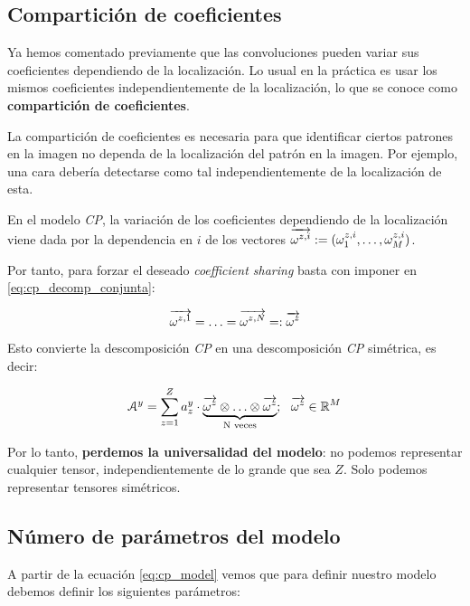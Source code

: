 \subsection{Compartición de coeficientes} \label{subs:comparticion_parametros_cp}

Ya hemos comentado previamente que las convoluciones pueden variar sus coeficientes dependiendo de la localización. Lo usual en la práctica es usar los mismos coeficientes independientemente de la localización, lo que se conoce como \textbf{compartición de coeficientes}.

La compartición de coeficientes es necesaria para que identificar ciertos patrones en la imagen no dependa de la localización del patrón en la imagen. Por ejemplo, una cara debería detectarse como tal independientemente de la localización de esta.

En el modelo \textit{CP}, la variación de los coeficientes dependiendo de la localización viene dada por la dependencia en $i$ de los vectores $\overrightarrow{\omega^{z,i}} := (\omega^{z, i}_1, \ldots, \omega^{z, i}_M)$.

Por tanto, para forzar el deseado \textit{coefficient sharing} basta con imponer en \eqref{eq:cp_decomp_conjunta}:

\begin{equation}
    \overrightarrow{\omega^{z, 1}} = \ldots = \overrightarrow{\omega^{z, N}} =: \overrightarrow{\omega^z}
\end{equation}

Esto convierte la descomposición \textit{CP} en una descomposición \textit{CP} simétrica, es decir:

\begin{equation}
    \mathcal{A}^y = \sum_{z = 1}^Z a_z^y \cdot \underbrace{\overrightarrow{\omega^z} \otimes \ldots \otimes \overrightarrow{\omega^z}}_\textrm{N veces}; \ \  \overrightarrow{\omega^z} \in \mathbb{R}^M
\end{equation}

Por lo tanto, \textbf{perdemos la universalidad del modelo}: no podemos representar cualquier tensor, independientemente de lo grande que sea $Z$. Solo podemos representar tensores simétricos.

\subsection{Número de parámetros del modelo} \label{msubsec:parametros_modelo_cp}

A partir de la ecuación \eqref{eq:cp_model} vemos que para definir nuestro modelo debemos definir los siguientes parámetros:

